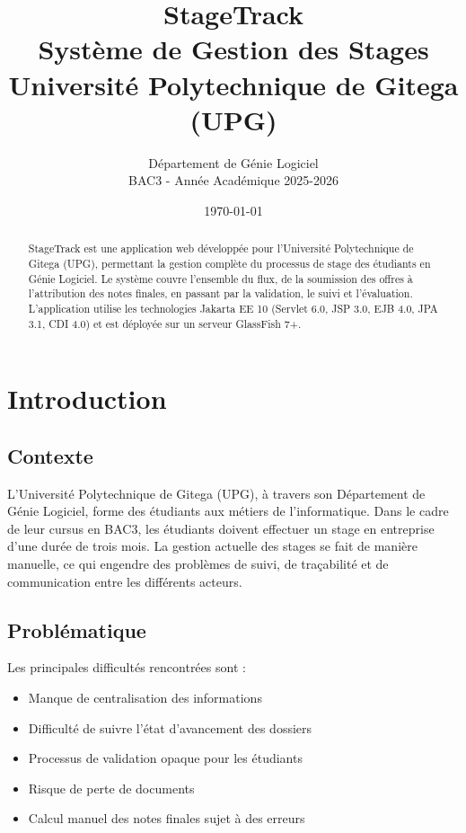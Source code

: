 \documentclass[12pt,a4paper]{report}
\title{\textbf{StageTrack} \\ Système de Gestion des Stages \\ Université Polytechnique de Gitega (UPG)}
\author{Département de Génie Logiciel \\ BAC3 - Année Académique 2025-2026}
\date{\today}
\begin{document}
\maketitle

\begin{abstract}
StageTrack est une application web développée pour l'Université Polytechnique de Gitega (UPG), permettant la gestion complète du processus de stage des étudiants en Génie Logiciel. Le système couvre l'ensemble du flux, de la soumission des offres à l'attribution des notes finales, en passant par la validation, le suivi et l'évaluation. L'application utilise les technologies Jakarta EE 10 (Servlet 6.0, JSP 3.0, EJB 4.0, JPA 3.1, CDI 4.0) et est déployée sur un serveur GlassFish 7+.
\end{abstract}

\tableofcontents

\chapter{Introduction}

\section{Contexte}
L'Université Polytechnique de Gitega (UPG), à travers son Département de Génie Logiciel, forme des étudiants aux métiers de l'informatique. Dans le cadre de leur cursus en BAC3, les étudiants doivent effectuer un stage en entreprise d'une durée de trois mois. La gestion actuelle des stages se fait de manière manuelle, ce qui engendre des problèmes de suivi, de traçabilité et de communication entre les différents acteurs.

\section{Problématique}
Les principales difficultés rencontrées sont :
\begin{itemize}
    \item Manque de centralisation des informations
    \item Difficulté de suivre l'état d'avancement des dossiers
    \item Processus de validation opaque pour les étudiants
    \item Risque de perte de documents
    \item Calcul manuel des notes finales sujet à des erreurs
\end{itemize}
\end{document}

